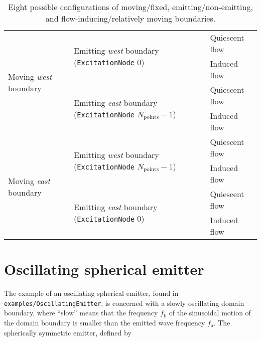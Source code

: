 \begin{table}
    \centering
    \caption{Eight possible configurations of moving/fixed, emitting/non-emitting, and flow-inducing/relatively moving boundaries.}
    \label{tab:hierarchyMotion}
    \begin{tabular}{|l|l|l|}
        \hline
        \multirow{4}{*}{Moving \textit{west} boundary} & \multirow{2}{*}{Emitting \textit{west} boundary ({\tt ExcitationNode} 0)}                       & Quiescent flow \\
        \cline{3-3}
                                              &                                                                                        & Induced flow   \\
        \cline{2-3}
                                              & \multirow{2}{*}{Emitting \textit{east} boundary ({\tt ExcitationNode} $N_{\mathrm{points}}-1$)} & Quiescent flow \\
        \cline{3-3}
                                              &                                                                                        & Induced flow   \\
        \cline{1-3}
        \multirow{4}{*}{Moving \textit{east} boundary} & \multirow{2}{*}{Emitting \textit{west} boundary ({\tt ExcitationNode} $N_{\mathrm{points}}-1$)} & Quiescent flow \\
        \cline{3-3}
                                              &                                                                                        & Induced flow   \\
        \cline{2-3}
                                              & \multirow{2}{*}{Emitting \textit{east} boundary ({\tt ExcitationNode} $0$)}                     & Quiescent flow \\
        \cline{3-3}
                                              &                                                                                        & Induced flow   \\
        \hline
    \end{tabular}
\end{table}


\section{Oscillating spherical emitter}


The example of an oscillating spherical emitter, found in {\tt examples/OscillatingEmitter}, is concerned with a slowly oscillating domain boundary, where ``slow'' means that the frequency $f_{\mathrm{b}}$ of the sinusoidal motion of the domain boundary is smaller than the emitted wave frequency $f_{\mathrm{a}}$. The spherically symmetric emitter, defined by

